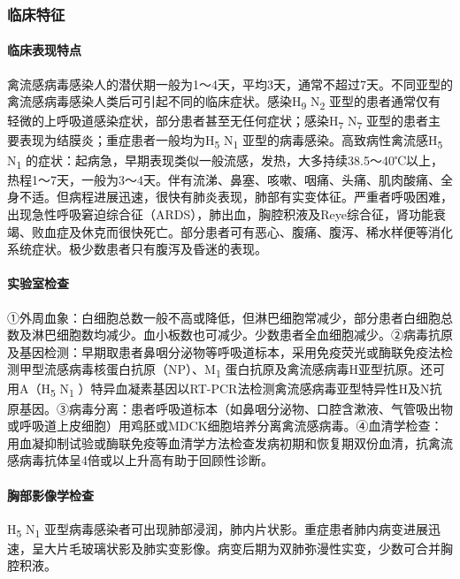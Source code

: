 \subsubsection{临床特征}

\paragraph{临床表现特点}

禽流感病毒感染人的潜伏期一般为1～4天，平均3天，通常不超过7天。不同亚型的禽流感病毒感染人类后可引起不同的临床症状。感染H\textsubscript{9}
N\textsubscript{2}
亚型的患者通常仅有轻微的上呼吸道感染症状，部分患者甚至无任何症状；感染H\textsubscript{7}
N\textsubscript{7}
亚型的患者主要表现为结膜炎；重症患者一般均为H\textsubscript{5}
N\textsubscript{1} 亚型的病毒感染。高致病性禽流感H\textsubscript{5}
N\textsubscript{1}
的症状：起病急，早期表现类似一般流感，发热，大多持续38.5～40℃以上，热程1～7天，一般为3～4天。伴有流涕、鼻塞、咳嗽、咽痛、头痛、肌肉酸痛、全身不适。但病程进展迅速，很快有肺炎表现，肺部有实变体征。严重者呼吸困难，出现急性呼吸窘迫综合征（ARDS），肺出血，胸腔积液及Reye综合征，肾功能衰竭、败血症及休克而很快死亡。部分患者可有恶心、腹痛、腹泻、稀水样便等消化系统症状。极少数患者只有腹泻及昏迷的表现。

\paragraph{实验室检查}

①外周血象：白细胞总数一般不高或降低，但淋巴细胞常减少，部分患者白细胞总数及淋巴细胞数均减少。血小板数也可减少。少数患者全血细胞减少。②病毒抗原及基因检测：早期取患者鼻咽分泌物等呼吸道标本，采用免疫荧光或酶联免疫法检测甲型流感病毒核蛋白抗原（NP）、M\textsubscript{1}
蛋白抗原及禽流感病毒H亚型抗原。还可用A（H\textsubscript{5}
N\textsubscript{1}
）特异血凝素基因以RT-PCR法检测禽流感病毒亚型特异性H及N抗原基因。③病毒分离：患者呼吸道标本（如鼻咽分泌物、口腔含漱液、气管吸出物或呼吸道上皮细胞）用鸡胚或MDCK细胞培养分离禽流感病毒。④血清学检查：用血凝抑制试验或酶联免疫等血清学方法检查发病初期和恢复期双份血清，抗禽流感病毒抗体呈4倍或以上升高有助于回顾性诊断。

\paragraph{胸部影像学检查}

H\textsubscript{5} N\textsubscript{1}
亚型病毒感染者可出现肺部浸润，肺内片状影。重症患者肺内病变进展迅速，呈大片毛玻璃状影及肺实变影像。病变后期为双肺弥漫性实变，少数可合并胸腔积液。

